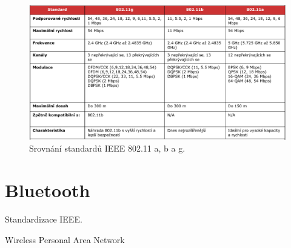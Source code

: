 \begin{figure}[H]
    \centering
    \includegraphics[width=1\linewidth]{802_11_abg.pdf}
    \caption{Srovnání standardů IEEE 802.11 a, b a g.}
\end{figure}


\section{Bluetooth}

Standardizace IEEE.

Wireless Personal Area Network










